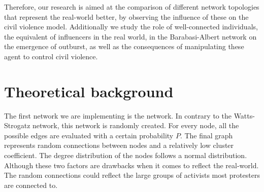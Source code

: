 \documentclass[10pt]{article}
\begin{document}
    Therefore, our research is aimed at the comparison of different network topologies that represent the real-world better, by observing the influence of these on the civil violence model. Additionally we study the role of well-connected individuals, the equivalent of influencers in the real world, in the Barabasi-Albert network on the emergence of outburst, as well as the consequences of manipulating these agent to control civil violence.


    \newpage

    \section*{Theoretical background}

    The first network we are implementing is the \cite{erdHos1960evolution} network. In contrary to the Watts-Strogatz network, this network is randomly created. For every node, all the possible edges are evaluated with a certain probability $P$. The final graph represents random connections between nodes and a relatively low cluster coefficient. The degree distribution of the nodes follows a normal distribution. Although these two factors are drawbacks when it comes to reflect the real-world. The random connections could reflect the large groups of activists most protesters are connected to.\\
\end{document}
